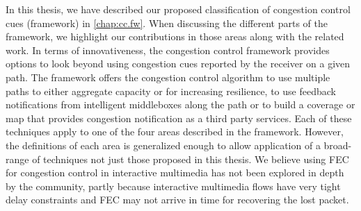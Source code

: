 
In this thesis, we have described our proposed classification of congestion
control cues (framework) in \ref{chap:cc.fw}. When discussing the different
parts of the framework, we highlight our contributions in those areas along
with the related work. In terms of innovativeness, the congestion control
framework provides options to look beyond using congestion cues reported by
the receiver on a given path. The framework offers the congestion control
algorithm to use multiple paths to either aggregate capacity or for increasing
resilience, to use feedback notifications from intelligent middleboxes along
the path or to build a coverage or map that provides congestion notification
as a third party services. Each of these techniques apply to one of the four
areas described in the framework. However, the definitions of each area is
generalized enough to allow application of a broad-range of techniques not
just those proposed in this thesis. We believe using FEC for congestion
control in interactive multimedia has not been explored in depth by the
community, partly because interactive multimedia flows have very tight delay
constraints and FEC may not arrive in time for recovering the lost packet.



